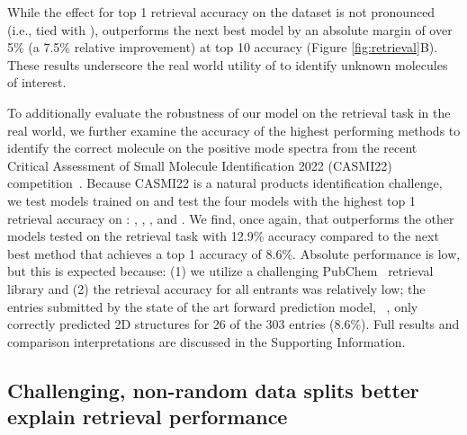 \documentclass[journal=jcim,manuscript=article]{achemso}
\begin{document}
While the effect for top 1 retrieval accuracy on the \nistData dataset is not pronounced (i.e., tied with \Massformer), \ourModel outperforms the next best model by an absolute margin of over 5\% (a 7.5\% relative improvement) at top 10 accuracy (Figure \ref{fig:retrieval}B). These results underscore the real world utility of \ourModel to identify unknown molecules of interest.

To additionally evaluate the robustness of our model on the retrieval task in the real world, we further examine the accuracy of the highest performing methods to identify the correct molecule on the positive mode spectra from the recent Critical Assessment of Small Molecule Identification 2022 (CASMI22) competition~\cite{noauthor_critical_nodate}. Because CASMI22 is a natural products identification challenge, we test models trained on \gnpsData and test the four models with the highest top 1 retrieval accuracy on \gnpsData: \ourModel, \Massformer, \neimsFFN, and \FixedVocab. We find, once again, that \ourModel outperforms the other models tested on the retrieval task with 12.9\% accuracy compared to the next best \neimsFFN method that achieves a top 1 accuracy of 8.6\%. Absolute performance is low, but this is expected because: (1) we utilize a challenging PubChem~\cite{kim_pubchem_2019} retrieval library and (2) the retrieval accuracy for all entrants was relatively low; the entries submitted by the state of the art forward prediction model, \cfmModel~\cite{wang_cfm-id_2021}, only correctly predicted 2D structures for 26 of the 303 entries (8.6\%). Full results and comparison interpretations are discussed in the Supporting Information.

\subsection{Challenging, non-random data splits better explain retrieval performance}
\label{sec:spec_scaffold}
\end{document}
